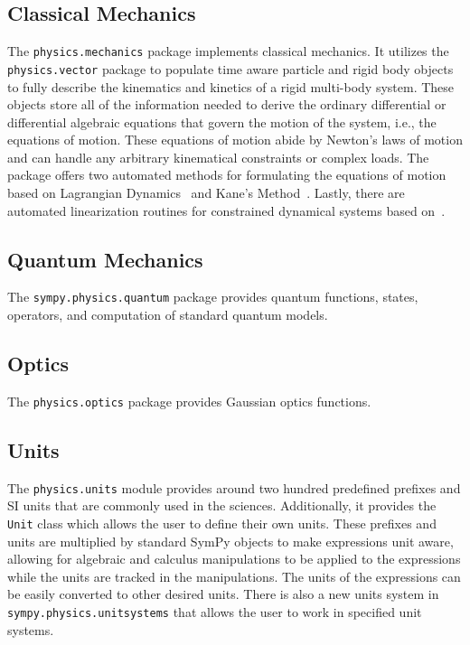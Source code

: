 \subsection{Classical Mechanics}

The \verb|physics.mechanics| package implements classical mechanics. It
utilizes the \verb|physics.vector| package to populate time aware particle and
rigid body objects to fully describe the kinematics and kinetics of a rigid
multi-body system. These objects store all of the information needed to derive
the ordinary differential or differential algebraic equations that govern the
motion of the system, i.e., the equations of motion. These equations of motion
abide by Newton's laws of motion and can handle any arbitrary kinematical
constraints or complex loads. The package offers two automated methods for
formulating the equations of motion based on Lagrangian
Dynamics~\cite{Lagrange1811} and Kane's Method~\cite{Kane1985}. Lastly, there
are automated linearization routines for constrained dynamical systems based
on~\cite{Peterson2014}.

\subsection{Quantum Mechanics}

The \verb|sympy.physics.quantum| package provides quantum functions, states,
operators, and computation of standard quantum models.


\subsection{Optics}

The \verb|physics.optics| package provides Gaussian optics functions.


\subsection{Units}

The \verb|physics.units| module provides around two hundred predefined prefixes
and SI units that are commonly used in the sciences. Additionally, it provides
the \verb|Unit| class which allows the user to define their own units.  These
prefixes and units are multiplied by standard SymPy objects to make expressions
unit aware, allowing for algebraic and calculus manipulations to be applied to
the expressions while the units are tracked in the manipulations.  The units of
the expressions can be easily converted to other desired units.  There is also
a new units system in \verb|sympy.physics.unitsystems| that allows the user to
work in specified unit systems.

